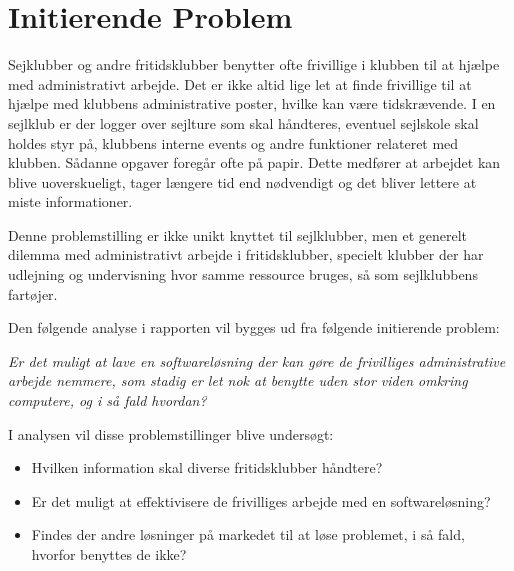 \section{Initierende Problem}
Sejklubber og andre fritidsklubber benytter ofte frivillige i klubben til at hjælpe med administrativt arbejde. Det er ikke altid lige let at finde frivillige til at hjælpe med klubbens administrative poster, hvilke kan være tidskrævende. I en sejlklub er der logger over sejlture som skal håndteres, eventuel sejlskole skal holdes styr på, klubbens interne events og andre funktioner relateret med klubben. Sådanne opgaver foregår ofte på papir. Dette medfører at arbejdet kan blive uoverskueligt, tager længere tid end nødvendigt og det bliver lettere at miste informationer.

Denne problemstilling er ikke unikt knyttet til sejlklubber, men et generelt dilemma med administrativt arbejde i fritidsklubber, specielt klubber der har udlejning og undervisning hvor samme ressource bruges, så som sejlklubbens fartøjer. 

Den følgende analyse i rapporten vil bygges ud fra følgende initierende problem:

\textit{Er det muligt at lave en softwareløsning der kan gøre de frivilliges administrative arbejde nemmere, som stadig er let nok at benytte uden stor viden omkring computere, og i så fald hvordan?}

I analysen vil disse problemstillinger blive undersøgt:
\begin{itemize}
\item Hvilken information skal diverse fritidsklubber håndtere?
\item Er det muligt at effektivisere de frivilliges arbejde med en softwareløsning?
\item Findes der andre løsninger på markedet til at løse problemet, i så fald, hvorfor benyttes de ikke?
\end{itemize}